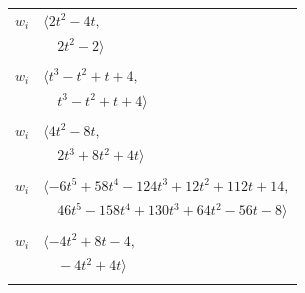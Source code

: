 \documentclass[11pt]{article}
\begin{document}
\begin{longtable}{@{}ll@{}}
$w_i$ & $\langle 2t^{2}-4t,$\\
 & $\quad 2t^{2}-2\rangle$\\
\addlinespace[2pt]
\multicolumn{2}{@{}p{0.97\textwidth}@{}}{$i=31$, $D_i=1$, $\rho_{ij}$: $0{:}1, \allowbreak 3{:}1, \allowbreak 18{:}2, \allowbreak 20{:}1, \allowbreak 30{:}1, \allowbreak 33{:}1$}\\
$w_i$ & $\langle t^{3}-t^{2}+t+4,$\\
 & $\quad t^{3}-t^{2}+t+4\rangle$\\
\addlinespace[2pt]
\multicolumn{2}{@{}p{0.97\textwidth}@{}}{$i=32$, $D_i=1$, $\rho_{ij}$: $6{:}1, \allowbreak 9{:}1, \allowbreak 18{:}2, \allowbreak 20{:}1, \allowbreak 23{:}1, \allowbreak 27{:}1, \allowbreak 29{:}1, \allowbreak 33{:}2$}\\
$w_i$ & $\langle 4t^{2}-8t,$\\
 & $\quad 2t^{3}+8t^{2}+4t\rangle$\\
\addlinespace[2pt]
\multicolumn{2}{@{}p{0.97\textwidth}@{}}{$i=33$, $D_i=1$, $\rho_{ij}$: $0{:}2, \allowbreak 1{:}2, \allowbreak 9{:}1, \allowbreak 15{:}1, \allowbreak 18{:}1, \allowbreak 20{:}1, \allowbreak 22{:}1, \allowbreak 25{:}1, \allowbreak 27{:}2, \allowbreak 29{:}1, \allowbreak 30{:}2, \allowbreak 31{:}2, \allowbreak 32{:}1, \allowbreak 34{:}2$}\\
$w_i$ & $\langle -6t^{5}+58t^{4}-124t^{3}+12t^{2}+112t+14,$\\
 & $\quad 46t^{5}-158t^{4}+130t^{3}+64t^{2}-56t-8\rangle$\\
\addlinespace[2pt]
\multicolumn{2}{@{}p{0.97\textwidth}@{}}{$i=34$, $D_i=1$, $\rho_{ij}$: $6{:}2, \allowbreak 8{:}2, \allowbreak 29{:}2, \allowbreak 33{:}1$}\\
$w_i$ & $\langle -4t^{2}+8t-4,$\\
 & $\quad -4t^{2}+4t\rangle$\\
\addlinespace[2pt]
\end{longtable}
\endgroup
\end{document}
